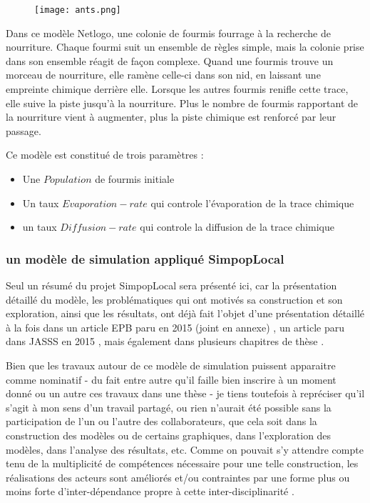 \begin{figure}[H]
		\centering
	 	\texttt{[image: ants.png]}
\end{figure}

Dans ce modèle Netlogo, une colonie de fourmis fourrage à la recherche de nourriture. Chaque fourmi suit un ensemble de règles simple, mais la colonie prise dans son ensemble réagit de façon complexe. Quand une fourmis trouve un morceau de nourriture, elle ramène celle-ci dans son nid, en laissant une empreinte chimique derrière elle. Lorsque les autres fourmis renifle cette trace, elle suive la piste jusqu'à la nourriture. Plus le nombre de fourmis rapportant de la nourriture vient à augmenter, plus la piste chimique est renforcé par leur passage.

Ce modèle est constitué de trois paramètres :
\begin{itemize}[label=\textbullet,noitemsep,nolistsep]
\item Une $Population$ de fourmis initiale
\item Un taux $Evaporation-rate$ qui controle l'évaporation de la trace chimique
\item un taux $Diffusion-rate$ qui controle la diffusion de la trace chimique
\end{itemize}

\subsubsection{un modèle de simulation appliqué SimpopLocal}

Seul un résumé du projet SimpopLocal sera présenté ici, car la présentation détaillé du modèle, les problématiques qui ont motivés sa construction et son exploration, ainsi que les résultats, ont déjà fait l'objet d'une présentation détaillé à la fois dans un article EPB paru en 2015 \autocite{Schmitt2015} (joint en annexe) , un article paru dans JASSS en 2015 \autocite{Reuillon2015}, mais également dans plusieurs chapitres de thèse \autocite{Schmitt2014}.

Bien que les travaux autour de ce modèle de simulation puissent apparaitre comme nominatif - du fait entre autre qu'il faille bien inscrire à un moment donné ou un autre ces travaux dans une thèse - je tiens toutefois à repréciser qu'il s'agit à mon sens d'un travail partagé, ou rien n'aurait été possible sans la participation de l'un ou l'autre des collaborateurs, que cela soit dans la construction des modèles ou de certains graphiques, dans l'exploration des modèles, dans l'analyse des résultats, etc. Comme on pouvait s'y attendre compte tenu de la multiplicité de compétences nécessaire pour une telle construction, les réalisations des acteurs sont améliorés et/ou contraintes par une forme plus ou moins forte d'inter-dépendance propre à cette inter-disciplinarité \autocite{Chapron2014}.

